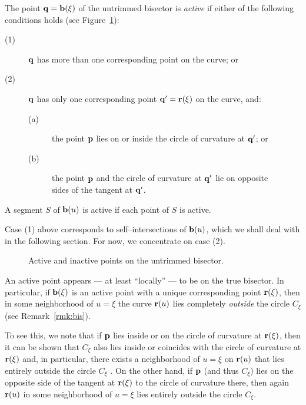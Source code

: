 \begin{dfn} {\rm
The point ${\bf q}={\bf b}(\xi)$ of the untrimmed bisector
is {\it active\/} if either of the following conditions holds
(see Figure~\ref{fig:active}):
\begin{description}
\item[{\rm (1)}]
        ${\bf q}$ has more than one corresponding point on
        the curve; or
\item[{\rm (2)}]
        ${\bf q}$ has only one corresponding point ${\bf q}'
        ={\bf r}(\xi)$ on the curve, and:
\begin{description}
\item[{\rm (a)}]
        the point ${\bf p}$ lies on or inside the circle of
        curvature at ${\bf q}'$; or
\item[{\rm (b)}]
        the point ${\bf p}$ and the circle of curvature at
        ${\bf q}'$ lie on opposite \\ sides of the tangent
        at ${\bf q}'$.
\end{description}
\end{description}
A segment $S$ of ${\bf b}(u)$ is active if each point of $S$
is active. }
\end{dfn}

Case (1) above corresponds to self--intersections of ${\bf b}(u)$,
which we shall deal with in the following section. For now, we
concentrate on case (2).

\begin{figure}[htbp] \vspace{2.4in}
\caption[]{Active and inactive points on the untrimmed bisector.}
\label{fig:active} \end{figure}

An active point appears --- at least ``locally'' --- to be on
the true bisector. In particular, if ${\bf b}(\xi)$ is an active
point with a unique corresponding point ${\bf r}(\xi)$, then in
some neighborhood of $u=\xi$ the curve ${\bf r}(u)$ lies completely
{\it outside\/} the circle $C_\xi$ (see Remark~\ref{rmk:bis}).

To see this, we note that if ${\bf p}$ lies inside or on the
circle of curvature at ${\bf r}(\xi)$, then it can be shown \cite
[Lemma~3.1]{farouki91b} that $C_\xi$ also lies inside or coincides
with the circle of curvature at ${\bf r}(\xi)$ and, in particular,
there exists a neighborhood of $u=\xi$ on ${\bf r}(u)$ that lies
entirely outside the circle $C_\xi$ \cite[p.~176]{H52}. On the
other hand, if ${\bf p}$ (and thus $C_\xi$) lies on the opposite
side of the tangent at ${\bf r}(\xi)$ to the circle of curvature
there, then again ${\bf r}(u)$ in some neighborhood of $u=\xi$
lies entirely outside the circle $C_\xi$.


